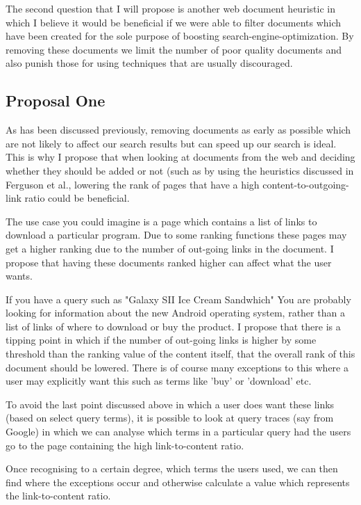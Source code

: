 \documentclass{acm_proc_article-sp}
\begin{document}
The second question that I will propose is another web document heuristic in which I believe it would be beneficial if we were able to filter documents which have been created for the sole purpose of boosting search-engine-optimization. By removing these documents we limit the number of poor quality documents and also punish those for using techniques that are usually discouraged. 

\subsection{Proposal One}

As has been discussed previously, removing documents as early as possible which are not likely to affect our search results but can speed up our search is ideal. This is why I propose that when looking at documents from the web and deciding whether they should be added or not (such as by using the heuristics discussed in Ferguson et al., lowering the rank of pages that have a high content-to-outgoing-link ratio could be beneficial.

The use case you could imagine is a page which contains a list of links to download a particular program. Due to some ranking functions these pages may get a higher ranking due to the number of out-going links in the document. I propose that having these documents ranked higher can affect what the user wants.

If you have a query such as "Galaxy SII Ice Cream Sandwhich" You are probably looking for information about the new Android operating system, rather than a list of links of where to download or buy the product. I propose that there is a tipping point in which if the number of out-going links is higher by some threshold than the ranking value of the content itself, that the overall rank of this document should be lowered. There is of course many exceptions to this where a user may explicitly want this such as terms like 'buy' or 'download' etc.

To avoid the last point discussed above in which a user does want these links (based on select query terms), it is possible to look at query traces (say from Google) in which we can analyse which terms in a particular query had the users go to the page containing the high link-to-content ratio.

Once recognising to a certain degree, which terms the users used, we can then find where the exceptions occur and otherwise calculate a value which represents the link-to-content ratio.
\end{document}

